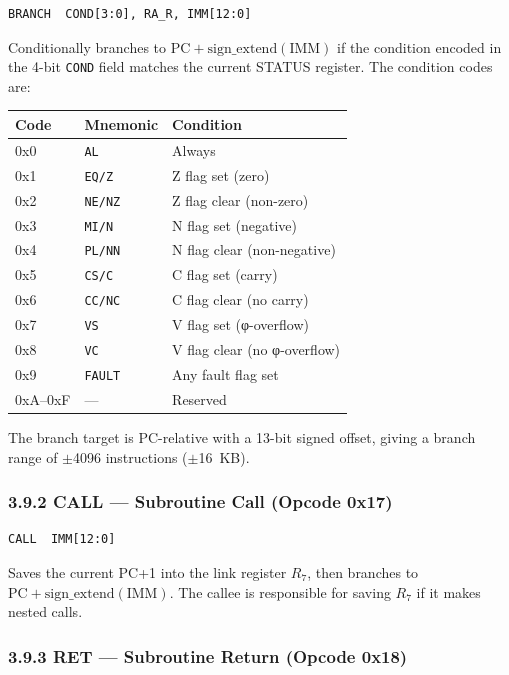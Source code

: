 \begin{verbatim}
BRANCH  COND[3:0], RA_R, IMM[12:0]
\end{verbatim}

Conditionally branches to \(\text{PC} + \text{sign\_extend}(\text{IMM})\)
if the condition encoded in the 4-bit \texttt{COND} field matches
the current STATUS register. The condition codes are:

\begin{longtable}[]{@{}lll@{}}
\toprule\noalign{}
Code & Mnemonic & Condition \\
\midrule\noalign{}
\endhead
\bottomrule\noalign{}
\endlastfoot
0x0 & \texttt{AL} & Always \\
0x1 & \texttt{EQ/Z} & Z flag set (zero) \\
0x2 & \texttt{NE/NZ} & Z flag clear (non-zero) \\
0x3 & \texttt{MI/N} & N flag set (negative) \\
0x4 & \texttt{PL/NN} & N flag clear (non-negative) \\
0x5 & \texttt{CS/C} & C flag set (carry) \\
0x6 & \texttt{CC/NC} & C flag clear (no carry) \\
0x7 & \texttt{VS} & V flag set (φ-overflow) \\
0x8 & \texttt{VC} & V flag clear (no φ-overflow) \\
0x9 & \texttt{FAULT} & Any fault flag set \\
0xA--0xF & --- & Reserved \\
\end{longtable}

The branch target is PC-relative with a 13-bit signed offset,
giving a branch range of $\pm$4096 instructions ($\pm$16~KB).

\subsubsection{3.9.2 CALL --- Subroutine Call (Opcode 0x17)}

\begin{verbatim}
CALL  IMM[12:0]
\end{verbatim}

Saves the current PC+1 into the link register \(R_7\), then
branches to \(\text{PC} + \text{sign\_extend}(\text{IMM})\).
The callee is responsible for saving \(R_7\) if it makes
nested calls.

\subsubsection{3.9.3 RET --- Subroutine Return (Opcode 0x18)}

